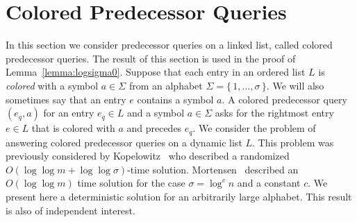 \documentclass[11pt]{article}\usepackage{fullpage}
\begin{document}



\newpage
\appendix
\renewcommand\thesection{A.\arabic{section}}

\section{Colored Predecessor Queries}
\label{sec:markpred}
In this section we consider predecessor queries on a linked list, called  colored predecessor queries.  The result of this section  is used in the proof of Lemma~\ref{lemma:logsigma0}.
Suppose that each entry in an ordered list $L$ is \emph{colored} with a symbol $a\in \Sigma$ from an alphabet $\Sigma=\{\,1,\ldots,\sigma\,\}$. We will also sometimes say that 
an entry $e$ contains a symbol $a$. 
A colored predecessor query $(e_q,a)$ for an entry $e_q\in L$ and a symbol $a\in \Sigma$ asks for the rightmost entry $e\in L$ 
that is   colored with $a$ and precedes $e_q$. We consider the problem of answering colored predecessor queries on a dynamic list $L$. 
This problem was previously considered by Kopelowitz~\cite{Kopelowitz12} who described  a randomized $O(\log\log m +\log\log \sigma)$-time solution.
Mortensen~\cite{Mor03} described an $O(\log\log m)$ time solution for the case $\sigma=\log^cn$ and a  constant $c$. 
We present here a deterministic solution for an arbitrarily large alphabet. This result is also of independent interest. 
\end{document}
